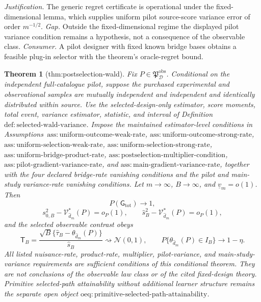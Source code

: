 \documentclass{article}
\newtheorem{theorem}{Theorem}
\begin{document}
\par\smallskip\noindent \textit{Justification.} The generic regret certificate is operational under the fixed-dimensional lemma, which supplies uniform pilot source-score variance error of order \(m^{-1/2}\). \textit{Gap.} Outside the fixed-dimensional regime the displayed pilot variance condition remains a hypothesis, not a consequence of the observable class. \textit{Consumer.} A pilot designer with fixed known bridge bases obtains a feasible plug-in selector with the theorem's oracle-regret bound.

\begin{theorem}[thm:postselection-wald]\label{thm:postselection-wald}
Fix \(P\in\mathfrak P_{\mathcal D}^{\mathrm{obs}}\). Conditional on the independent full-catalogue pilot, suppose the purchased experimental and observational samples are mutually independent and independent and identically distributed within source. Use the selected-design-only estimator, score moments, total event, variance estimator, statistic, and interval of Definition~\(\mathrm{def{:}selected\text{-}wald\text{-}variance}\). Impose the maintained estimator-level conditions in Assumptions~\(\mathrm{ass{:}uniform\text{-}outcome\text{-}weak\text{-}rate}\), \(\mathrm{ass{:}uniform\text{-}outcome\text{-}strong\text{-}rate}\), \(\mathrm{ass{:}uniform\text{-}selection\text{-}weak\text{-}rate}\), \(\mathrm{ass{:}uniform\text{-}selection\text{-}strong\text{-}rate}\), \(\mathrm{ass{:}uniform\text{-}bridge\text{-}product\text{-}rate}\), \(\mathrm{ass{:}postselection\text{-}multiplier\text{-}condition}\), \(\mathrm{ass{:}pilot\text{-}gradient\text{-}variance\text{-}rate}\), and \(\mathrm{ass{:}main\text{-}gradient\text{-}variance\text{-}rate}\), together with the four declared bridge-rate vanishing conditions and the pilot and main-study variance-rate vanishing conditions. Let \(m\to\infty\), \(B\to\infty\), and \(\underline v_m=o(1)\). Then
\[
 P(\mathsf G_{\mathrm{tot}})\longrightarrow1,
\]
\[
 s_{0,B}^2-\mathcal V_{\widehat d_m}^*(P)=o_P(1),
 \qquad
 \widehat s_B^2-\mathcal V_{\widehat d_m}^*(P)=o_P(1),
\]
and the selected observable contrast obeys
\[
 \mathsf T_B=
 \frac{\sqrt B\{\widehat\tau_B-\theta_{\widehat d_m}(P)\}}{\widehat s_B}
 \rightsquigarrow\mathcal N(0,1),
 \qquad
 P\{\theta_{\widehat d_m}(P)\in I_B\}\longrightarrow1-\eta.
\]
All listed nuisance-rate, product-rate, multiplier, pilot-variance, and main-study-variance requirements are sufficient conditions of this conditional theorem. They are not conclusions of the observable law class or of the cited fixed-design theory. Primitive selected-path attainability without additional learner structure remains the separate open object \(\mathrm{oeq{:}primitive\text{-}selected\text{-}path\text{-}attainability}\).
\end{theorem}
\end{document}
